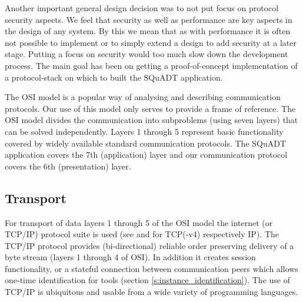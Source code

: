 \documentclass{article}
\newcommand{\squadt}{SQuADT\xspace}
\begin{document}
   Another important general design decision was to not put focus on protocol
   security aspects. We feel that security as well as performance are key
   aspects in the design of any system. By this we mean that as with
   performance it is often not possible to implement or to simply extend a
   design to add security at a later stage. Putting a focus on security would
   too much slow down the development process. The main goal has been on
   getting a proof-of-concept implementation of a protocol-stack on which to
   built the \squadt application.

   The OSI model \cite{Day1983} is a popular way of analysing and describing
   communication protocols. Our use of this model only serves to provide a
   frame of reference. The OSI model divides the communication into subproblems
   (using seven layers) that can be solved independently. Layers 1 through 5
   represent basic functionality covered by widely available standard
   communication protocols. The \squadt application covers the 7th
   (application) layer and our communication protocol covers the 6th
   (presentation) layer.
   
  \subsection{Transport} \label{ss:transport}

   For transport of data layers 1 through 5 of the OSI model the internet (or
   TCP/IP) protocol suite is used (see \cite{rfc793} and \cite{rfc791} for
   TCP(-v4) respectively IP). The TCP/IP protocol provides (bi-directional)
   reliable order preserving delivery of a byte stream (layers 1 through 4 of
   OSI). In addition it creates session functionality, or a stateful connection
   between communication peers which allows one-time identification for tools
   (section \ref{s:instance_identification}).  The use of TCP/IP is ubiquitous
   and usable from a wide variety of programming languages.

\end{document}
